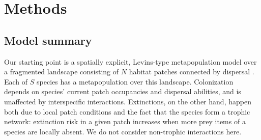 \documentclass[11pt]{article}
\begin{document}
\section{Methods} \label{sec:methods}

\subsection{Model summary} \label{sec:model}

Our starting point is a spatially explicit, Levins-type metapopulation model over a fragmented landscape consisting of $N$ habitat patches connected by dispersal \citep{HanskiOvaskainen2000, HanskiOvaskainen2003, OvaskainenHanski2001, Grillietal2015}. Each of $S$ species has a metapopulation over this landscape. Colonization depends on species' current patch occupancies and dispersal abilities, and is unaffected by interspecific interactions. Extinctions, on the other hand, happen both due to local patch conditions and the fact that the species form a trophic network: extinction risk in a given patch increases when more prey items of a species are locally absent. We do not consider non-trophic interactions here.
\end{document}
